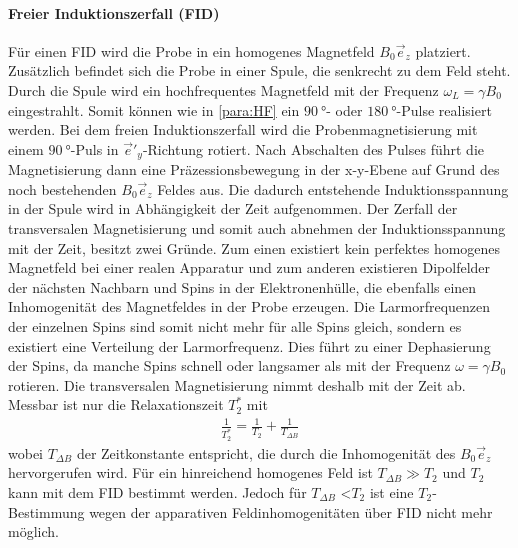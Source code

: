\paragraph{Freier Induktionszerfall (FID)}
Für einen FID wird die Probe
in ein homogenes Magnetfeld $B_0\vec{e}_z$ platziert.
Zusätzlich befindet sich die Probe in einer
Spule, die senkrecht zu dem Feld steht.
Durch die Spule wird ein hochfrequentes Magnetfeld
mit der Frequenz $\omega_L=\gamma B_0$ eingestrahlt.
Somit können wie in \ref{para:HF} ein $\SI{90}{\degree}$- oder $\SI{180}{\degree}$-Pulse
realisiert werden.
Bei dem freien Induktionszerfall wird die Probenmagnetisierung mit einem
$\SI{90}{\degree}$-Puls in $\vec{e}'_y$-Richtung rotiert. Nach
Abschalten des Pulses
führt die Magnetisierung dann eine Präzessionsbewegung in der
x-y-Ebene auf Grund des noch bestehenden $B_0\vec{e}_z$ Feldes aus.
Die dadurch entstehende Induktionsspannung in der Spule wird in Abhängigkeit der Zeit aufgenommen.
Der Zerfall der transversalen Magnetisierung und somit auch abnehmen der
Induktionsspannung mit der Zeit, besitzt zwei Gründe.
Zum einen existiert kein perfektes homogenes Magnetfeld bei einer
realen Apparatur und zum anderen
existieren Dipolfelder der nächsten Nachbarn und Spins in der Elektronenhülle,
die ebenfalls einen Inhomogenität des Magnetfeldes in der Probe erzeugen.
Die Larmorfrequenzen der einzelnen Spins sind somit nicht mehr für alle Spins
gleich, sondern es existiert eine Verteilung der Larmorfrequenz.
Dies führt zu einer Dephasierung
der Spins, da manche Spins schnell oder langsamer
als mit der Frequenz $\omega=\gamma B_0$ rotieren.
Die transversalen Magnetisierung nimmt deshalb mit der Zeit ab.
Messbar ist nur die Relaxationszeit $T_2^*$
mit
\begin{align}
  \frac{1}{T_2^*} = \frac{1}{T_2} + \frac{1}{T_{\Delta B}}
\end{align}
wobei $T_{\Delta B}$ der Zeitkonstante entspricht, die durch die Inhomogenität
des $B_0\vec{e}_z$ hervorgerufen wird.
Für ein hinreichend homogenes Feld ist $T_{\Delta B} \gg T_2$
und $T_2$ kann mit dem FID bestimmt werden.
Jedoch für $T_{\Delta B}$ \textless $T_2$ ist eine $T_2$-Bestimmung wegen
der apparativen Feldinhomogenitäten über FID nicht mehr möglich.

